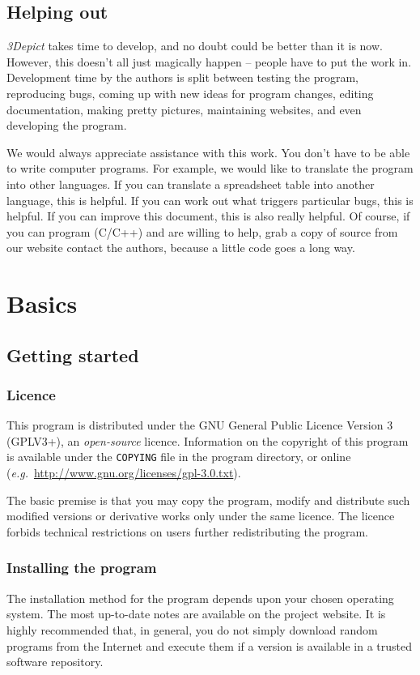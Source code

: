 \documentclass[10pt]{article}
\begin{document}
\subsection{Helping out}

\emph{3Depict} takes time to develop, and no doubt could be better than it is now. However, this doesn't all just magically happen -- people have to put the work in. Development time by the authors is split between testing the program, reproducing bugs, coming up with new ideas for program changes, editing documentation, making pretty pictures, maintaining websites, and even developing the program. 

We would always appreciate assistance with this work. You don't have to be able to write computer programs. For example, we would like to translate the program into other languages. If you can translate a spreadsheet table into another language, this is helpful. If you can work out what triggers particular bugs, this is  helpful. If you can improve this document, this is also really helpful. Of course, if you can program (C/C++) and are willing to help, grab a copy of source from our website contact the authors, because a little code goes a long way.

\section{Basics}
\subsection{Getting started}
\subsubsection{Licence}
\label{sec:licence} 
This program is distributed under the GNU General Public Licence Version 3 (GPLV3+), an \textit{open-source} licence. Information on the copyright of this program is available under the \texttt{COPYING} file in the program directory, or online (\emph{e.g.}\ \url{http://www.gnu.org/licenses/gpl-3.0.txt}).

The basic premise is that you may copy the program, modify and distribute such modified versions or derivative works only under the same licence. The licence forbids technical restrictions on users further redistributing the program.
 
\subsubsection{Installing the program}
The installation method for the program depends upon your chosen operating system. The most up-to-date notes are available on the project website. It is highly recommended that, in general, you do not simply download random programs from the Internet and execute them if a version is available in a trusted software repository. 
\end{document}
